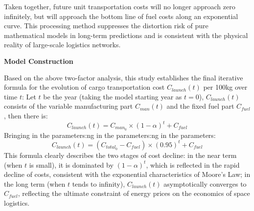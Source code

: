 \indent Taken together, future unit transportation costs will no longer approach zero infinitely, but will approach the bottom line of fuel costs along an exponential curve. This processing method suppresses the distortion risk of pure mathematical models in long-term predictions and is consistent with the physical reality of large-scale logistics networks.\medskip

\noindent\textbf{Model Construction}\par
Based on the above two-factor analysis, this study establishes the final iterative formula for the evolution of cargo transportation cost $C_{launch}(t)$ per 100kg over time $t$:
Let $t$ be the year (taking the model starting year as $t = 0$), $C_{launch}(t)$ consists of the variable manufacturing part $C_{man}(t)$ and the fixed fuel part $C_{fuel}$, then there is:
\[C_{launch}(t)=C_{man_0}\times(1-\alpha)^t+C_{fuel}\]
Bringing in the parameters:ng in the parameters:ng in the parameters:
\[C_{launch}(t)=(C_{total_0}-C_{fuel})\times(0.95)^t+C_{fuel}\]
\indent This formula clearly describes the two stages of cost decline: in the near term (when $t$ is small), it is dominated by $(1 - \alpha)^t$, which is reflected in the rapid decline of costs, consistent with the exponential characteristics of Moore's Law; in the long term (when $t$ tends to infinity), $C_{launch}(t)$ asymptotically converges to $C_{fuel}$, reflecting the ultimate constraint of energy prices on the economics of space logistics.

